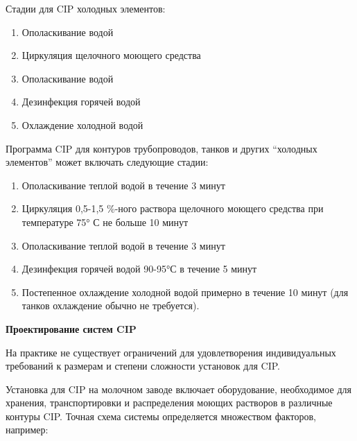 \documentclass[a4paper,12pt,oneside]{extarticle}
\begin{document}
\begin{flushleft}
	Стадии для CIP холодных элементов:
\end{flushleft}	

\begin{enumerate}
	\item Ополаскивание водой
	\item Циркуляция щелочного моющего средства
	\item Ополаскивание водой
	\item Дезинфекция горячей водой
	\item Охлаждение холодной водой
\end{enumerate}

\begin{flushleft}
	Программа CIP для контуров трубопроводов, танков и других “холодных элементов” может включать следующие стадии:
\end{flushleft}

\begin{enumerate}
	\item Ополаскивание теплой водой в течение 3 минут
	\item Циркуляция 0,5-1,5 \%-ного раствора щелочного моющего средства при температуре 75° С не больше 10 минут
	\item Ополаскивание теплой водой в течение 3 минут
	\item Дезинфекция горячей водой 90-95°С в течение 5 минут
	\item Постепенное охлаждение холодной водой примерно в течение 10 минут (для танков охлаждение обычно не требуется).
\end{enumerate}

\begin{flushleft}
	\bfseries 	Проектирование систем CIP
\end{flushleft}	

\begin{flushleft}
	На практике не существует ограничений для удовлетворения индивидуальных требований к размерам и степени сложности установок для CIP.
\end{flushleft}
 
\begin{flushleft}
Установка для CIP на молочном заводе включает оборудование, необходимое для хранения, транспортировки и распределения моющих растворов в различные контуры CIP. Точная схема системы определяется множеством факторов, например:
\end{flushleft}	
\end{document}
